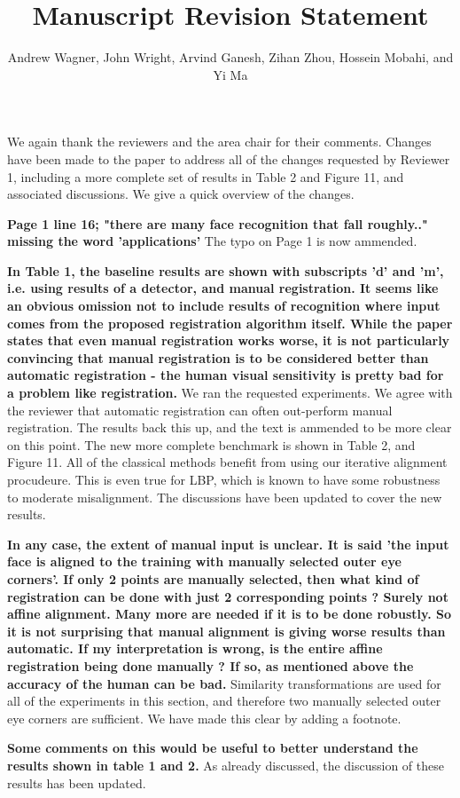 \documentclass[11pt]{article}
\begin{document}
   

   \title{\Large {\bf Manuscript  Revision Statement}}

   \author{{Andrew Wagner, John Wright, Arvind Ganesh, Zihan Zhou, Hossein Mobahi, and Yi Ma}}

   \date{}
   \maketitle

We again thank the reviewers and the area chair for their comments.
Changes have been made to the paper to address all of the changes requested by Reviewer 1,
including a more complete set of results in Table 2 and Figure 11, and associated 
discussions.  We give a quick overview of the changes.

{\bf
	Page 1 line 16; "there are many face recognition that fall roughly.."
	missing the word 'applications'
}
The typo on Page 1 is now ammended.

{\bf
	In Table 1, the baseline results are shown with subscripts 'd' and 'm', i.e.
	using results of a detector, and manual registration. It seems like an obvious
	omission not to include results of recognition where input comes from the
	proposed registration algorithm itself. While the paper states that even
	manual registration works worse, it is not particularly convincing that manual
	registration is to be considered better than automatic registration - the
	human visual sensitivity is pretty bad for a problem like registration.
}
We ran the requested experiments.  We agree with the reviewer that automatic registration
can often out-perform manual registration.  The results back this up, and the text
is ammended to be more clear on this point.  The new more complete benchmark is shown in
Table 2, and Figure 11.  All of the classical methods benefit from using our iterative
alignment procudeure.  This is even true for LBP, which is known to have some robustness
to moderate misalignment.  The discussions have been updated to cover the new results.

{\bf
	In any case, the extent of manual input is unclear. It is said 'the input face
	is aligned to the training with manually selected outer eye corners'. If only
	2 points are manually selected, then what kind of registration can be done
	with just 2 corresponding points ? Surely not affine alignment. Many more are
	needed if it is to be done robustly. So it is not surprising that manual
	alignment is giving worse results than automatic. If my interpretation is
	wrong, is the entire affine registration being done manually ? If so, as
	mentioned above the accuracy of the human can be bad.
}
Similarity transformations are used for all of the experiments in this section, and
therefore two manually selected outer eye corners are sufficient.  We have
made this clear by adding a footnote.

{\bf
	Some comments on this would be useful to better understand the results shown in table 1 and 2.
}
As already discussed, the discussion of these results has been updated. 
\end{document}
